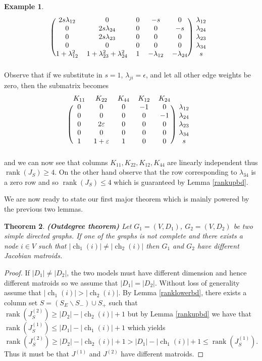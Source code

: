 \documentclass[12pt,reqno]{amsart}
\theoremstyle{plain}
\newtheorem{theorem}{Theorem}[section]
\theoremstyle{definition}
\newtheorem{example}[theorem]{Example}
\DeclareMathOperator{\ch}{ch}
\DeclareMathOperator{\rank}{rank}
\begin{document}
\begin{example}
\[\begin{blockarray}{cccccc}
\begin{block}{(ccccc)c}
2s\lambda_{12} & 0 & 0    & -s & 0 & \lambda_{12}\\
0 & 2s\lambda_{24} & 0    & 0 & -s & \lambda_{24}\\
0 & 2s\lambda_{23} & 0    & 0 & 0 & \lambda_{23}\\
0 & 0 & 0    & 0 & 0 & \lambda_{34}\\
1+\lambda_{12}^2 & 1+\lambda_{23}^2+\lambda_{24}^2 & 1 & -\lambda_{12} & -\lambda_{24} & s\\
\end{block}
\end{blockarray}
\]
Observe that if we substitute in $s = 1$, $\lambda_{ji} = \epsilon$, and let all other edge weights be zero, then the submatrix becomes
\[
\begin{blockarray}{cccccc}
K_{11} & K_{22} & K_{44} & K_{12} & K_{24} \\
\begin{block}{(ccccc)c}
0 & 0 & 0    & -1 & 0 & \lambda_{12}\\
0 & 0 & 0    & 0 & -1 & \lambda_{24}\\
0 & 2\varepsilon & 0 & 0 & 0 & \lambda_{23}\\
0 & 0 & 0    & 0 & 0 & \lambda_{34}\\
1 & 1+\varepsilon & 1 & 0 & 0 & s\\
\end{block}
\end{blockarray}
\]
and we can now see that columns $K_{11}, K_{22}, K_{12}, K_{44}$ are linearly independent thus $\rank(J_S) \geq 4$. On the other hand observe that the row corresponding to $\lambda_{34}$ is a zero row and so $\rank(J_S)\leq 4$ which is guaranteed by Lemma \ref{rankupbd}. 
\end{example}

We are now ready to state our first major theorem which is mainly powered by the previous two lemmas. 

\begin{theorem}\label{outd}
\textup{\textbf{(Outdegree theorem)}}
Let $G_1=(V,D_1)$, $G_2=(V,D_2)$ be two simple directed graphs. If one of the graphs is not complete and there exists a node $i \in V$ such that $|\ch_{1}(i)| \neq |\ch_{2}(i)|$ then $G_1$ and $G_2$ have different Jacobian matroids.
\end{theorem}

\begin{proof}
If $|D_1|\neq |D_2|$, the two models must have different dimension and hence different matroids so we assume that $|D_1| = |D_2|$. 
Without loss of generality assume that $|\ch_1(i)|>|\ch_2(i)|$. By Lemma \ref{ranklowerbd}, there exists a column set $S=(S_E\backslash S_-)\cup S_+$ such that $\rank(J^{(2)}_S)\geq |D_2|-|\ch_2(i)|+1$ but by Lemma \ref{rankupbd} we have that $\rank(J^{(1)}_S)\leq |D_1|-|\ch_1(i)|+1$ which yields
\[
\rank(J^{(2)}_S) \geq |D_2| - |\ch_2(i)|  + 1 > |D_1| - |\ch_1(i)| + 1 \leq \rank(J^{(1)}_S). 
\]
Thus it must be that $J^{(1)}$ and $J^{(2)}$ have different matroids. 
\end{proof}
\end{document}
